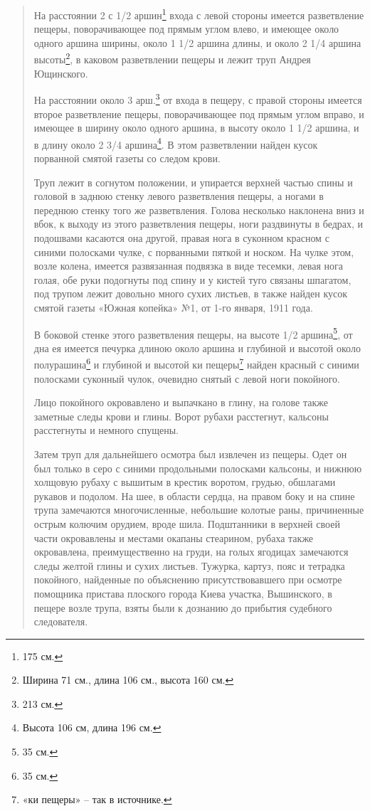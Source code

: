 \begin{quotation}
На расстоянии 2 с 1/2 аршин\footnote{175 см.} входа с левой стороны имеется разветвление пещеры, поворачивающее под прямым углом влево, и имеющее около одного аршина ширины, около 1 1/2 аршина длины, и около 2 1/4 аршина высоты\footnote{Ширина 71 см., длина 106 см., высота 160 см.}, в каковом разветвлении пещеры и лежит труп Андрея Ющинского.

На расстоянии около 3 арш.\footnote{213 см.} от входа в пещеру, с правой стороны имеется второе разветвление пещеры, поворачивающее под прямым углом вправо, и имеющее в ширину около одного аршина, в высоту около 1 1/2 аршина, и в длину около 2 3/4 аршина\footnote{Высота 106 см, длина 196 см.}. В этом разветвлении найден кусок порванной смятой газеты со следом крови.

Труп лежит в согнутом положении, и упирается верхней частью спины и головой в заднюю стенку левого разветвления пещеры, а ногами в переднюю стенку того же разветвления. Голова несколько наклонена вниз и вбок, к выходу из этого разветвления пещеры, ноги раздвинуты в бедрах, и подошвами касаются она другой, правая нога в суконном красном с синими полосками чулке, с порванными пяткой и носком. На чулке этом, возле колена, имеется развязанная подвязка в виде тесемки, левая нога голая, обе руки подогнуты под спину и у кистей туго связаны шпагатом, под трупом лежит довольно много сухих листьев, в также найден кусок смятой газеты «Южная копейка» №1, от 1-го января, 1911 года. 

В боковой стенке этого разветвления пещеры, на высоте 1/2 аршина\footnote{35 см.}, от дна ея имеется печурка длиною около аршина и глубиной и высотой около полурашина\footnote{35 см.} и глубиной и высотой ки пещеры\footnote{«ки пещеры» – так в источнике.} найден красный с синими полосками суконный чулок, очевидно снятый с левой ноги покойного.

Лицо покойного окровавлено и выпачкано в глину, на голове также заметные следы крови и глины. Ворот рубахи расстегнут, кальсоны расстегнуты и немного спущены.

Затем труп для дальнейшего осмотра был извлечен из пещеры. Одет он был только в серо с синими продольными полосками кальсоны, и нижнюю холщовую рубаху с вышитым в крестик воротом, грудью, обшлагами рукавов и подолом. На шее, в области сердца, на правом боку и на спине трупа замечаются многочисленные, небольшие колотые раны, причиненные острым колючим орудием, вроде шила. Подштанники в верхней своей части окровавлены и местами окапаны стеарином, рубаха также окровавлена, преимущественно на груди, на голых ягодицах замечаются следы желтой глины и сухих листьев. Тужурка, картуз, пояс и тетрадка покойного, найденные по объяснению присутствовавшего при осмотре помощника пристава плоского города Киева участка, Вышинского, в пещере возле трупа, взяты были к дознанию до прибытия судебного следователя.


\end{quotation}
